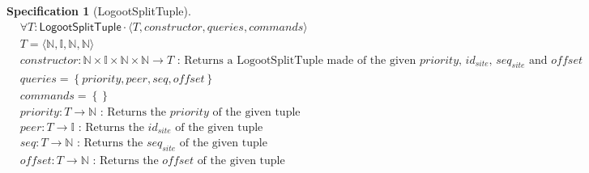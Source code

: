\documentclass{article}
\newcommand{\commands}[1]{commands = \set{#1}}
\newcommand{\fnspec}[3]{#1: #2 \text{ : #3}}
\newcommand{\queries}[1]{queries = \set{#1}}
\newcommand{\set}[1]{\left\{#1\right\}} %
\newcommand{\spectuple}[1]{\tuple{#1, constructor, queries, commands}}
\newcommand{\tuple}[1]{\langle #1 \rangle}
\theoremstyle{definition}
\newcounter{note-counter}
\theoremstyle{definition}
\theoremstyle{definition}
\newcounter{specificationcounter}
\theoremstyle{definition}
\newtheorem{specification}[specificationcounter]{Specification}
\begin{document}

\begin{specification}[LogootSplitTuple]
    \begin{align*}
    &\forall T: \mathsf{LogootSplitTuple} \cdot \spectuple{T}\\
    &T = \tuple{\mathbb{N}, \mathbb{I}, \mathbb{N}, \mathbb{N}}\\
    &\fnspec{constructor}{\mathbb{N} \times \mathbb{I} \times \mathbb{N} \times \mathbb{N} \to T}{Returns a LogootSplitTuple made of the given $priority$, $id_{site}$, $seq_{site}$ and $offset$}\\
    &\queries{priority, peer, seq, offset}\\
    &\commands{}\\
    &\fnspec{priority}{T \to \mathbb{N}}{Returns the $priority$ of the given tuple}\\
    &\fnspec{peer}{T \to \mathbb{I}}{Returns the $id_{site}$ of the given tuple}\\
    &\fnspec{seq}{T \to \mathbb{N}}{Returns the $seq_{site}$ of the given tuple}\\
    &\fnspec{offset}{T \to \mathbb{N}}{Returns the $offset$ of the given tuple}
    \end{align*}
    \label{spec:logootsplit-tuple}
\end{specification}
\end{document}
